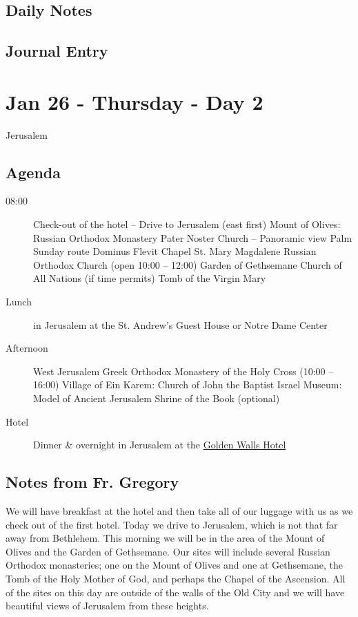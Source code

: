\documentclass[letterpaper]{report}
\begin{document}
\clearpage
\subsection{Daily Notes}

\clearpage
\subsection{Journal Entry}

\clearpage
\section{Jan 26 - Thursday - Day 2}
Jerusalem
\subsection{Agenda}
\begin{description}
	\item[08:00] Check-out of the hotel – Drive to Jerusalem (east first)
	    \subitem Mount of Olives: Russian Orthodox Monastery
	    \subitem Pater Noster Church -- Panoramic view
	    \subitem Palm Sunday route
	    \subitem Dominus Flevit Chapel
	    \subitem St. Mary Magdalene Russian Orthodox Church
	        (open 10:00 – 12:00)
	    \subitem Garden of Gethsemane
	    \subitem Church of All Nations (if time permits)
	    \subitem Tomb of the Virgin Mary
	\item[Lunch] in Jerusalem at the
			St. Andrew’s Guest House or Notre Dame Center
	\item[Afternoon] West Jerusalem
	    \subitem Greek Orthodox Monastery of the Holy Cross (10:00 – 16:00)
		\subitem Village of Ein Karem: Church of John the Baptist 
		\subitem Israel Museum: Model of Ancient Jerusalem
		\subitem Shrine of the Book (optional)
	\item[Hotel] Dinner \& overnight in Jerusalem at the
	    \href{http://goldenwalls.com/}{Golden Walls Hotel}
\end{description}

\subsection{Notes from Fr. Gregory}
We will have breakfast at the hotel and then take all of our luggage with us 
as we check out of the first hotel.
Today we drive to Jerusalem, which is not that far away from Bethlehem.
This morning we will be in the area of the Mount of Olives and the Garden of
Gethsemane.
Our sites will include several Russian Orthodox monasteries;
one on the Mount of Olives and one at Gethsemane,
the Tomb of the Holy Mother of God,
and perhaps the Chapel of the Ascension.
All of the sites on this day are outside of the walls of the Old City and we
will have beautiful views of Jerusalem from these heights.
\end{document}
